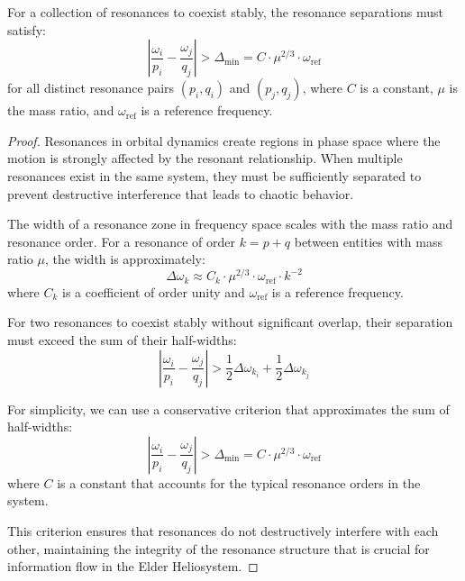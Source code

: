 \begin{theorem}
For a collection of resonances to coexist stably, the resonance separations must satisfy:
\begin{equation}
\left|\frac{\omega_i}{p_i} - \frac{\omega_j}{q_j}\right| > \Delta_{\text{min}} = C \cdot \mu^{2/3} \cdot \omega_{\text{ref}}
\end{equation}
for all distinct resonance pairs $(p_i, q_i)$ and $(p_j, q_j)$, where $C$ is a constant, $\mu$ is the mass ratio, and $\omega_{\text{ref}}$ is a reference frequency.
\end{theorem}

\begin{proof}
Resonances in orbital dynamics create regions in phase space where the motion is strongly affected by the resonant relationship. When multiple resonances exist in the same system, they must be sufficiently separated to prevent destructive interference that leads to chaotic behavior.

The width of a resonance zone in frequency space scales with the mass ratio and resonance order. For a resonance of order $k = p + q$ between entities with mass ratio $\mu$, the width is approximately:
\begin{equation}
\Delta\omega_k \approx C_k \cdot \mu^{2/3} \cdot \omega_{\text{ref}} \cdot k^{-2}
\end{equation}
where $C_k$ is a coefficient of order unity and $\omega_{\text{ref}}$ is a reference frequency.

For two resonances to coexist stably without significant overlap, their separation must exceed the sum of their half-widths:
\begin{equation}
\left|\frac{\omega_i}{p_i} - \frac{\omega_j}{q_j}\right| > \frac{1}{2}\Delta\omega_{k_i} + \frac{1}{2}\Delta\omega_{k_j}
\end{equation}

For simplicity, we can use a conservative criterion that approximates the sum of half-widths:
\begin{equation}
\left|\frac{\omega_i}{p_i} - \frac{\omega_j}{q_j}\right| > \Delta_{\text{min}} = C \cdot \mu^{2/3} \cdot \omega_{\text{ref}}
\end{equation}
where $C$ is a constant that accounts for the typical resonance orders in the system.

This criterion ensures that resonances do not destructively interfere with each other, maintaining the integrity of the resonance structure that is crucial for information flow in the Elder Heliosystem.


\end{proof}
